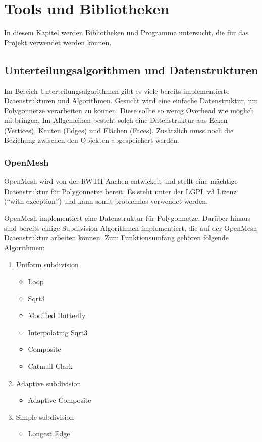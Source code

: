 \chapter{Tools und Bibliotheken}

In diesem Kapitel werden Bibliotheken und Programme untersucht, die für das Projekt verwendet werden können. 
 
\section{Unterteilungsalgorithmen und Datenstrukturen}

Im Bereich Unterteilungsalgorithmen gibt es viele bereits implementierte Datenstrukturen und Algorithmen.
Gesucht wird eine einfache Datenstruktur, um Polygonnetze verarbeiten zu können.
Diese sollte so wenig Overhead wie möglich mitbringen.
Im Allgemeinen besteht solch eine Datenstruktur aus Ecken (Vertices), Kanten (Edges) und Flächen (Faces).
Zusätzlich muss noch die Beziehung zwischen den Objekten abgespeichert werden.

\subsection{OpenMesh}

OpenMesh wird von der \acs{RWTH} Aachen entwickelt und stellt eine mächtige Datenstruktur für Polygonnetze bereit.
Es steht unter der \acs{LGPL} v3 Lizenz (\enquote{with exception}) und kann somit problemlos verwendet werden.

OpenMesh implementiert eine Datenstruktur für Polygonnetze.
Darüber hinaus sind bereits einige Subdivision Algorithmen implementiert, die auf der OpenMesh Datenstruktur arbeiten können.
Zum Funktionsumfang gehören folgende Algorithmen:

\begin{enumerate}
\item Uniform subdivision
\begin{itemize}
	\item Loop
	\item Sqrt3
	\item Modified Butterfly
	\item Interpolating Sqrt3
	\item Composite
	\item Catmull Clark
\end{itemize}
\item Adaptive subdivision
\begin{itemize}
	\item Adaptive Composite
\end{itemize}
\item Simple subdivision
\begin{itemize}
	\item Longest Edge
\end{itemize}
\end{enumerate}

